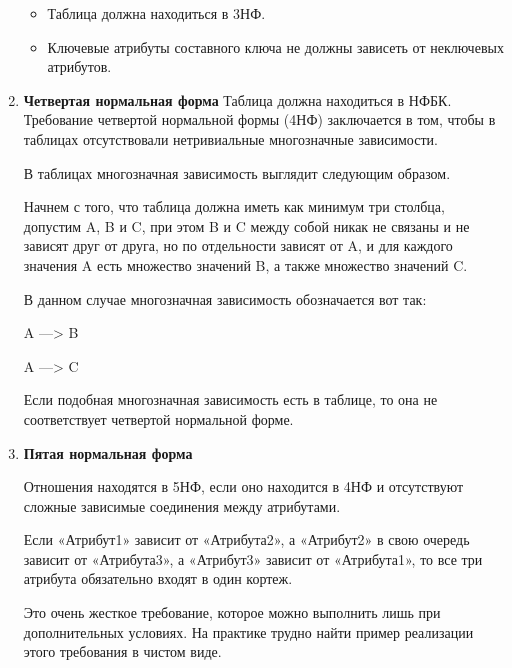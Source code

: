 \begin{enumerate}
    \begin{itemize}
	    \item Таблица должна находиться в 3НФ. 
	    \item Ключевые атрибуты составного ключа не должны зависеть от неключевых атрибутов.
    \end{itemize}


    \item \textbf{Четвертая нормальная форма}
    Таблица должна находиться в НФБК.
    Требование четвертой нормальной формы (4НФ) заключается в том, чтобы в таблицах отсутствовали нетривиальные многозначные зависимости.

    В таблицах многозначная зависимость выглядит следующим образом.

    Начнем с того, что таблица должна иметь как минимум три столбца, допустим A, B и C, при этом B и C между собой никак не связаны и не зависят друг от друга, но по отдельности зависят от A, и для каждого значения A есть множество значений B, а также множество значений C.

    В данном случае многозначная зависимость обозначается вот так:

    A —> B

    A —> C

    Если подобная многозначная зависимость есть в таблице, то она не соответствует четвертой нормальной форме.

\item  \textbf{Пятая нормальная форма}

    Отношения находятся в 5НФ, если оно находится в 4НФ и отсутствуют сложные зависимые соединения между атрибутами.

    Если «Атрибут1» зависит от «Атрибута2», а «Атрибут2» в свою очередь зависит от «Атрибута3», а «Атрибут3» зависит от «Атрибута1», то все три атрибута обязательно входят в один кортеж.

    Это очень жесткое требование, которое можно выполнить лишь при дополнительных условиях. На практике трудно найти пример реализации этого требования в чистом виде.


\end{enumerate}
